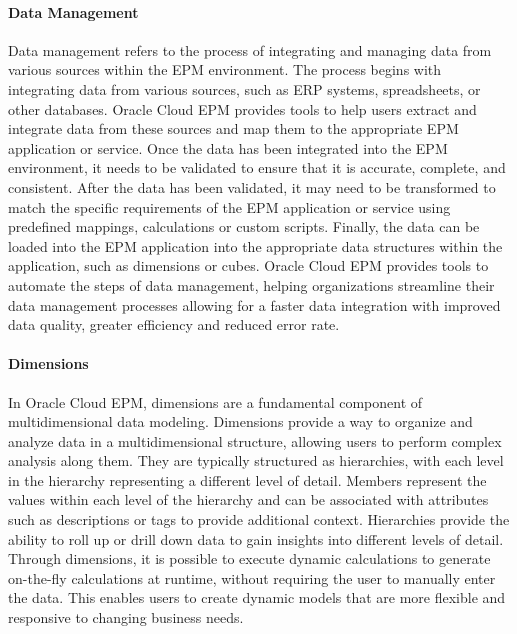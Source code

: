 \documentclass[12pt,a4paper,openright,twoside]{book}
\begin{document}
\paragraph{Data Management}

Data management refers to the process of integrating and managing data from various sources within the EPM environment. 
%
The process begins with integrating data from various sources, such as ERP systems, spreadsheets, or other databases. 
%
Oracle Cloud EPM provides tools to help users extract and integrate data from these sources and map them to the appropriate EPM application or service.
%
Once the data has been integrated into the EPM environment, it needs to be validated to ensure that it is accurate, complete, and consistent. 
%
After the data has been validated, it may need to be transformed to match the specific requirements of the EPM application or service using predefined mappings, calculations or custom scripts.
%
Finally, the data can be loaded into the EPM application into the appropriate data structures within the application, such as dimensions or cubes. 
%
Oracle Cloud EPM provides tools to automate the steps of data management,  helping organizations streamline their data management processes allowing for a faster data integration with improved data quality, greater efficiency and reduced error rate.

\paragraph{Dimensions}

In Oracle Cloud EPM, dimensions are a fundamental component of multidimensional data modeling. 
%
Dimensions provide a way to organize and analyze data in a multidimensional structure, allowing users to perform complex analysis along them. 
%
They are typically structured as hierarchies, with each level in the hierarchy representing a different level of detail. 
%
Members represent the values within each level of the hierarchy and can be associated with attributes such as descriptions or tags to provide additional context. 
%
Hierarchies provide the ability to roll up or drill down data to gain insights into different levels of detail. 
%
Through dimensions, it is possible to execute dynamic calculations to generate on-the-fly calculations at runtime, without requiring the user to manually enter the data. 
%
This enables users to create dynamic models that are more flexible and responsive to changing business needs.
\end{document}
